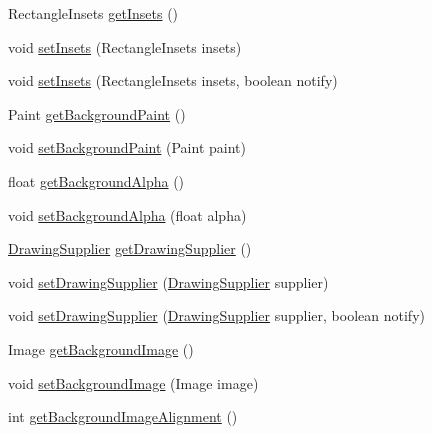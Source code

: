 \begin{DoxyCompactItemize}
\item 
Rectangle\+Insets \mbox{\hyperlink{classorg_1_1jfree_1_1chart_1_1plot_1_1_plot_a8c217375afeb9eae164af090797aacf1}{get\+Insets}} ()
\item 
void \mbox{\hyperlink{classorg_1_1jfree_1_1chart_1_1plot_1_1_plot_a53965b8c7aa0ea6215a2f37447112ba5}{set\+Insets}} (Rectangle\+Insets insets)
\item 
void \mbox{\hyperlink{classorg_1_1jfree_1_1chart_1_1plot_1_1_plot_a091b3d587405d49a6637c67b9b68d767}{set\+Insets}} (Rectangle\+Insets insets, boolean notify)
\item 
Paint \mbox{\hyperlink{classorg_1_1jfree_1_1chart_1_1plot_1_1_plot_aea2235170b06d5107e49522a96d7d19f}{get\+Background\+Paint}} ()
\item 
void \mbox{\hyperlink{classorg_1_1jfree_1_1chart_1_1plot_1_1_plot_a11a93f1c355ca548ad6b8c6e5b43241d}{set\+Background\+Paint}} (Paint paint)
\item 
float \mbox{\hyperlink{classorg_1_1jfree_1_1chart_1_1plot_1_1_plot_ad9d25c2b8b15314bf48b6bbb8be98bc0}{get\+Background\+Alpha}} ()
\item 
void \mbox{\hyperlink{classorg_1_1jfree_1_1chart_1_1plot_1_1_plot_a3af5eaa2997e7c1f88c87178e5cb41e4}{set\+Background\+Alpha}} (float alpha)
\item 
\mbox{\hyperlink{interfaceorg_1_1jfree_1_1chart_1_1plot_1_1_drawing_supplier}{Drawing\+Supplier}} \mbox{\hyperlink{classorg_1_1jfree_1_1chart_1_1plot_1_1_plot_a371e21293523674a59d87c9d62ffff15}{get\+Drawing\+Supplier}} ()
\item 
void \mbox{\hyperlink{classorg_1_1jfree_1_1chart_1_1plot_1_1_plot_a079267deccd4488e8110f2ce847d01a5}{set\+Drawing\+Supplier}} (\mbox{\hyperlink{interfaceorg_1_1jfree_1_1chart_1_1plot_1_1_drawing_supplier}{Drawing\+Supplier}} supplier)
\item 
void \mbox{\hyperlink{classorg_1_1jfree_1_1chart_1_1plot_1_1_plot_ad761c4dfba1f99d610c411531b14f711}{set\+Drawing\+Supplier}} (\mbox{\hyperlink{interfaceorg_1_1jfree_1_1chart_1_1plot_1_1_drawing_supplier}{Drawing\+Supplier}} supplier, boolean notify)
\item 
Image \mbox{\hyperlink{classorg_1_1jfree_1_1chart_1_1plot_1_1_plot_a22e81fa28885106c5cdc5d6411305c76}{get\+Background\+Image}} ()
\item 
void \mbox{\hyperlink{classorg_1_1jfree_1_1chart_1_1plot_1_1_plot_a93449bff646ac0c3a63c0657842a2e70}{set\+Background\+Image}} (Image image)
\item 
int \mbox{\hyperlink{classorg_1_1jfree_1_1chart_1_1plot_1_1_plot_ae0d72cd3dcbd9d4aad47d98d00a976ce}{get\+Background\+Image\+Alignment}} ()

\end{DoxyCompactItemize}
